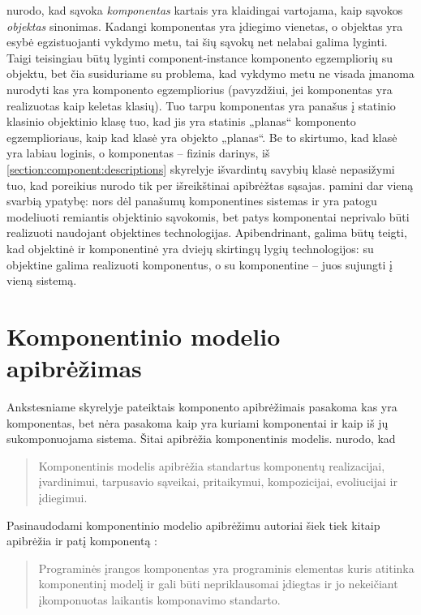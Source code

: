 \cite[36]{heineman2001component} nurodo, kad sąvoka \emph{komponentas}
kartais yra klaidingai vartojama, kaip sąvokos \emph{objektas}
sinonimas. Kadangi komponentas yra įdiegimo vienetas, o objektas yra
esybė egzistuojanti vykdymo metu, tai šių sąvokų net nelabai galima
lyginti. Taigi teisingiau būtų lyginti \gls{component-instance}{%
komponento egzempliorių} su objektu, bet čia susiduriame su problema,
kad vykdymo metu ne visada įmanoma nurodyti kas yra komponento
egzempliorius (pavyzdžiui, jei komponentas yra realizuotas kaip keletas
klasių). Tuo tarpu komponentas yra panašus į statinio klasinio objektinio
klasę tuo, kad jis yra statinis „planas“ komponento egzemplioriaus, kaip
kad klasė yra objekto „planas“. Be to skirtumo, kad klasė yra
labiau loginis, o komponentas – fizinis darinys, iš
\ref{section:component:descriptions} skyrelyje išvardintų savybių
klasė nepasižymi tuo, kad poreikius nurodo tik per išreikštinai
apibrėžtas sąsajas. \cite[36]{heineman2001component} pamini dar
vieną svarbią ypatybę: nors dėl panašumų komponentines sistemas ir
yra patogu modeliuoti remiantis objektinio sąvokomis, bet patys
komponentai neprivalo būti realizuoti naudojant objektines
technologijas. Apibendrinant, galima būtų teigti, kad objektinė
ir komponentinė yra dviejų skirtingų lygių technologijos: su
objektine galima realizuoti komponentus, o su komponentine – juos
sujungti į vieną sistemą.



\section{Komponentinio modelio apibrėžimas}

\label{section:component:model}

Ankstesniame skyrelyje pateiktais komponento apibrėžimais pasakoma kas
yra komponentas, bet nėra pasakoma kaip yra kuriami komponentai ir kaip
iš jų sukomponuojama sistema. Šitai apibrėžia komponentinis
modelis. \cite[37]{heineman2001component} nurodo, kad
\begin{quote}
  Komponentinis modelis apibrėžia standartus komponentų realizacijai,
  įvardinimui, tarpusavio sąveikai, pritaikymui, kompozicijai,
  evoliucijai ir įdiegimui.
\end{quote}
Pasinaudodami komponentinio modelio apibrėžimu autoriai šiek tiek
kitaip apibrėžia ir patį komponentą \cite[7]{heineman2001component}:
\begin{quote}
  Programinės įrangos komponentas yra programinis elementas kuris
  atitinka komponentinį modelį ir gali būti nepriklausomai įdiegtas
  ir jo nekeičiant įkomponuotas laikantis komponavimo standarto.
\end{quote}

